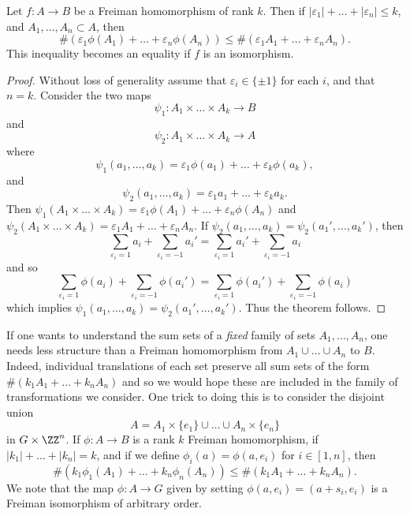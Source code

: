 \begin{lemma}
    Let $f:A \to B$ be a Freiman homomorphism of rank $k$. Then if $|\varepsilon_1| + \dots + |\varepsilon_n| \leq k$, and $A_1,\dots,A_n \subset A$, then
    \[ \#(\varepsilon_1 \phi(A_1) + \dots + \varepsilon_n \phi(A_n)) \leq \#(\varepsilon_1 A_1 + \dots + \varepsilon_n A_n). \]
    This inequality becomes an equality if $f$ is an isomorphism.
\end{lemma}
\begin{proof}
    Without loss of generality assume that $\varepsilon_i \in \{ \pm 1 \}$ for each $i$, and that $n = k$. Consider the two maps
    \[ \psi_1: A_1 \times \dots \times A_k \to B \]
    and
    \[ \psi_2: A_1 \times \dots \times A_k \to A \]
    where
    \[ \psi_1(a_1,\dots,a_k) = \varepsilon_1 \phi(a_1) + \dots + \varepsilon_k \phi(a_k), \]
    and
    \[ \psi_2(a_1,\dots,a_k) = \varepsilon_1 a_1 + \dots + \varepsilon_k a_k. \]
    Then $\psi_1(A_1 \times \dots \times A_k) = \varepsilon_1 \phi(A_1) + \dots + \varepsilon_n \phi(A_n)$ and $\psi_2(A_1 \times \dots \times A_k) = \varepsilon_1 A_1 + \dots + \varepsilon_n A_n$. If $\psi_2(a_1,\dots,a_k) = \psi_2(a_1',\dots,a_k')$, then
    \[ \sum_{\varepsilon_i = 1} a_i + \sum_{\varepsilon_i = -1} a_i' = \sum_{\varepsilon_i = 1} a_i' + \sum_{\varepsilon_i = -1} a_i \]
    and so
    \[ \sum_{\varepsilon_i = 1} \phi(a_i) + \sum_{\varepsilon_i = -1} \phi(a_i') = \sum_{\varepsilon_i = 1} \phi(a_i') + \sum_{\varepsilon_i = -1} \phi(a_i) \]
    which implies $\psi_1(a_1,\dots,a_k) = \psi_2(a_1',\dots,a_k')$. Thus the theorem follows.
\end{proof}

If one wants to understand the sum sets of a \emph{fixed} family of sets $A_1,\dots,A_n$, one needs less structure than a Freiman homomorphism from $A_1 \cup \dots \cup A_n$ to $B$. Indeed, individual translations of each set preserve all sum sets of the form $\#(k_1 A_1 + \dots + k_n A_n)$ and so we would hope these are included in the family of transformations we consider. One trick to doing this is to consider the disjoint union
%
\[ A = A_1 \times \{ e_1 \} \cup \dots \cup A_n \times \{ e_n \} \]
%
in $G \times \ZZ^n$. If $\phi: A \to B$ is a rank $k$ Freiman homomorphism, if $|k_1| + \dots + |k_n| = k$, and if we define $\phi_i(a) = \phi(a,e_i)$ for $i \in [1,n]$, then
%
\[ \#(k_1 \phi_1(A_1) + \dots + k_n \phi_n(A_n)) \leq \#(k_1 A_1 + \dots + k_n A_n). \]
%
We note that the map $\phi: A \to G$ given by setting $\phi(a,e_i) = (a + s_i, e_i)$ is a Freiman isomorphism of arbitrary order.

